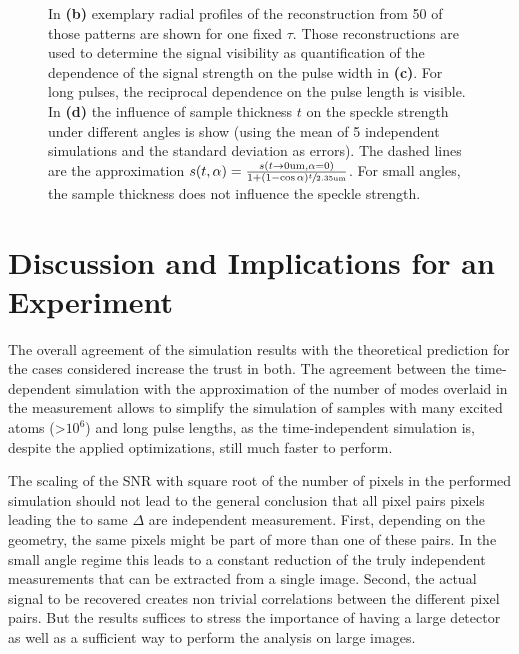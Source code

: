 \begin{figure}
{	In \textbf{(b)} exemplary radial profiles of the reconstruction from 50 of those patterns are shown for one fixed $\tau$. Those reconstructions are used to determine the signal visibility as quantification of the  dependence of the signal strength on the pulse width in \textbf{(c)}. For long pulses, the reciprocal dependence on the pulse length is visible.
	In \textbf{(d)}  the influence of sample thickness $t$ on the speckle strength under different angles is show (using the mean of 5 independent simulations and the standard deviation as errors). The dashed lines are the approximation $s(t,\alpha)=\frac{s(t\rightarrow0\text{um}, \alpha= 0)}{1+\left(1-\cos{\alpha}\right)\sfrac{t}{2.35\text{um}}}$. For small angles, the sample thickness does not influence the speckle strength.}
\end{figure}


\clearpage
\section{Discussion and Implications for an Experiment}
The overall agreement of the simulation results with the theoretical prediction for the cases considered increase the trust in both. The agreement between the time-dependent simulation with the approximation of the number of modes overlaid in the measurement allows to simplify the simulation of samples with many excited atoms (>$10^6$) and long pulse lengths, as the time-independent simulation is, despite the applied optimizations, still much faster to perform.

The scaling of the SNR with square root of the number of pixels in the performed simulation should not lead to the general conclusion that all pixel pairs pixels leading the to same $\Delta $ are independent measurement. First, depending on the geometry, the same pixels might be part of more than one of these pairs. In the small angle regime this leads to a constant reduction of the truly independent measurements that can be extracted from a single image. Second, the actual signal to be recovered creates non trivial correlations between the different pixel pairs. But the results suffices to stress the importance of having a large detector as well as a sufficient way to perform the analysis on large images.

